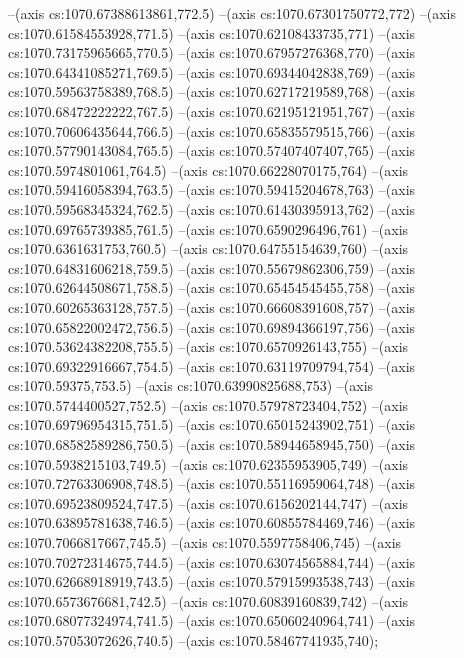 --(axis cs:1070.67388613861,772.5)
--(axis cs:1070.67301750772,772)
--(axis cs:1070.61584553928,771.5)
--(axis cs:1070.62108433735,771)
--(axis cs:1070.73175965665,770.5)
--(axis cs:1070.67957276368,770)
--(axis cs:1070.64341085271,769.5)
--(axis cs:1070.69344042838,769)
--(axis cs:1070.59563758389,768.5)
--(axis cs:1070.62717219589,768)
--(axis cs:1070.68472222222,767.5)
--(axis cs:1070.62195121951,767)
--(axis cs:1070.70606435644,766.5)
--(axis cs:1070.65835579515,766)
--(axis cs:1070.57790143084,765.5)
--(axis cs:1070.57407407407,765)
--(axis cs:1070.5974801061,764.5)
--(axis cs:1070.66228070175,764)
--(axis cs:1070.59416058394,763.5)
--(axis cs:1070.59415204678,763)
--(axis cs:1070.59568345324,762.5)
--(axis cs:1070.61430395913,762)
--(axis cs:1070.69765739385,761.5)
--(axis cs:1070.6590296496,761)
--(axis cs:1070.6361631753,760.5)
--(axis cs:1070.64755154639,760)
--(axis cs:1070.64831606218,759.5)
--(axis cs:1070.55679862306,759)
--(axis cs:1070.62644508671,758.5)
--(axis cs:1070.65454545455,758)
--(axis cs:1070.60265363128,757.5)
--(axis cs:1070.66608391608,757)
--(axis cs:1070.65822002472,756.5)
--(axis cs:1070.69894366197,756)
--(axis cs:1070.53624382208,755.5)
--(axis cs:1070.6570926143,755)
--(axis cs:1070.69322916667,754.5)
--(axis cs:1070.63119709794,754)
--(axis cs:1070.59375,753.5)
--(axis cs:1070.63990825688,753)
--(axis cs:1070.5744400527,752.5)
--(axis cs:1070.57978723404,752)
--(axis cs:1070.69796954315,751.5)
--(axis cs:1070.65015243902,751)
--(axis cs:1070.68582589286,750.5)
--(axis cs:1070.58944658945,750)
--(axis cs:1070.5938215103,749.5)
--(axis cs:1070.62355953905,749)
--(axis cs:1070.72763306908,748.5)
--(axis cs:1070.55116959064,748)
--(axis cs:1070.69523809524,747.5)
--(axis cs:1070.6156202144,747)
--(axis cs:1070.63895781638,746.5)
--(axis cs:1070.60855784469,746)
--(axis cs:1070.7066817667,745.5)
--(axis cs:1070.5597758406,745)
--(axis cs:1070.70272314675,744.5)
--(axis cs:1070.63074565884,744)
--(axis cs:1070.62668918919,743.5)
--(axis cs:1070.57915993538,743)
--(axis cs:1070.6573676681,742.5)
--(axis cs:1070.60839160839,742)
--(axis cs:1070.68077324974,741.5)
--(axis cs:1070.65060240964,741)
--(axis cs:1070.57053072626,740.5)
--(axis cs:1070.58467741935,740);

